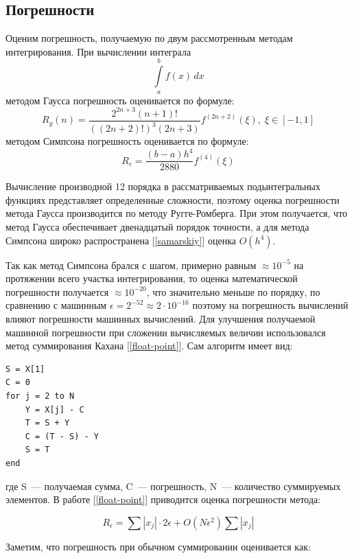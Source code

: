 \subsection{Погрешности}
Оценим погрешность, получаемую по двум рассмотренным методам интегрирования.
При вычислении интеграла 
\begin{equation}
\int\limits^b_af(x)\,dx
\end{equation}
методом Гаусса погрешность оценивается по формуле:  
\begin{equation}
R_g(n) = \dfrac{2^{2n+3}(n+1)!}{((2n+2)!)^3(2n+3)}f^{(2n+2)}(\xi),\; \xi \in [-1, 1]
\end{equation}
методом Симпсона погрешность оценивается по формуле:  
\begin{equation}
R_c = \dfrac{(b-a)h^4}{2880} f^{(4)}(\xi)
\end{equation}

Вычисление производной 12 порядка в рассматриваемых подынтегральных функциях представляет определенные сложности,
поэтому оценка погрешности метода Гаусса производится по методу Ругге-Ромберга. При этом получается, что метод Гаусса 
обеспечивает двенадцатый порядок точности, а для метода Симпсона  широко распространена [\ref{samarskiy}] оценка $O(h^4)$.

Так как метод Симпсона брался с шагом, примерно равным $\approx 10^{-5}$ на протяжении всего участка интегрирования, то оценка математической погрешности получается $\approx 10^{-20}$, что значительно меньше по порядку, по сравнению с машинным $\epsilon = 2^{-52} \approx 2\cdot10^{-16}$ поэтому на погрешность вычислений влияют погрешности машинных вычислений. 
Для улучшения получаемой машинной погрешности при сложении вычисляемых величин использовался метод суммирования Кахана [\ref{float-point}]. 
Сам алгоритм имеет вид:

\begin{lstlisting}
S = X[1]
C = 0
for j = 2 to N
	Y = X[j] - C
	T = S + Y
	C = (T - S) - Y
	S = T
end
\end{lstlisting}
где S~--- получаемая сумма, C~--- погрешность, N~--- количество суммируемых элементов. В работе [\ref{float-point}] приводится 
оценка погрешности метода:

\begin{equation}
R_{\epsilon} = \sum|x_j|\cdot 2\epsilon +  O(N\epsilon^2)\sum|x_j|
\end{equation}

Заметим, что погрешность при обычном суммировании оценивается как:

